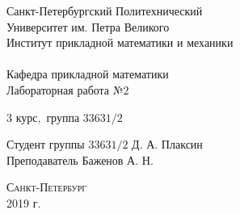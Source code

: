 \documentclass[a4]{article}
\begin{document}
\def\contentsname{\LARGE{Содержание}}
\thispagestyle{empty}
\begin{center} 
\vspace{2cm} 
{\Large \sc Санкт-Петербургский Политехнический}\\
\vspace{2mm}
{\Large \sc Университет} им. {\Large\sc Петра Великого}\\
\vspace{1cm}
{\large \sc Институт прикладной математики и механики\\ 
\vspace{0.5mm}
\textsc{}}\\ 
\vspace{0.5mm}
{\large\sc Кафедра прикладной математики}\\
\vspace{15mm}
{\huge \sc Лабораторная работа №$2$
\vspace{6mm}
 }
\vspace*{2mm}
\vspace{1cm}

{\sc $3$ курс$,$ группа $33631/2$}

\vspace{2cm} 
Студент группы $33631/2$ \hfill Д. А. Плаксин\\
\vspace{1cm}
Преподаватель \hfill Баженов А. Н.\\
\vspace{20mm} 

\end{center} 
\begin{center}
\vfill {\large\textsc{Санкт-Петербург}}\\ 
2019 г.
\end{center}


\newpage
\pagestyle{plain}
\end{document}
